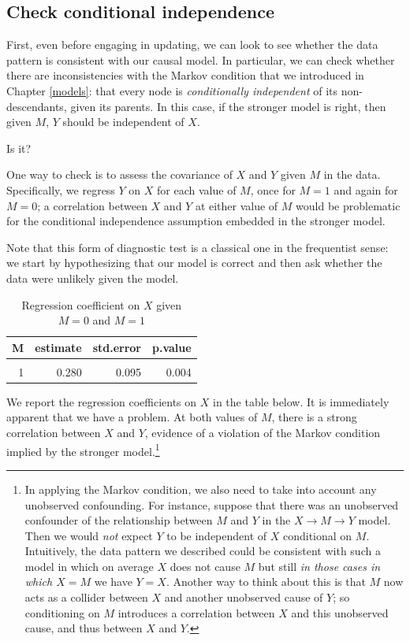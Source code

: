 \documentclass[
  12pt,
]{book}
\begin{document}
\hypertarget{check-conditional-independence}{%
\subsection{Check conditional independence}\label{check-conditional-independence}}

First, even before engaging in updating, we can look to see whether the data pattern is consistent with our causal model. In particular, we can check whether there are inconsistencies with the Markov condition that we introduced in Chapter \ref{models}: that every node is \emph{conditionally independent} of its non-descendants, given its parents. In this case, if the stronger model is right, then given \(M\), \(Y\) should be independent of \(X\).

Is it?

One way to check is to assess the covariance of \(X\) and \(Y\) given \(M\) in the data. Specifically, we regress \(Y\) on \(X\) for each value of \(M\), once for \(M=1\) and again for \(M=0\); a correlation between \(X\) and \(Y\) at either value of \(M\) would be problematic for the conditional independence assumption embedded in the stronger model.

Note that this form of diagnostic test is a classical one in the frequentist sense: we start by hypothesizing that our model is correct and then ask whether the data were unlikely given the model.

\begin{table}

\caption{\label{tab:unnamed-chunk-41}Regression coefficient on $X$ given $M=0$ and $M=1$}
\centering
\begin{tabular}[t]{rrrr}
\toprule
M & estimate & std.error & p.value\\
\midrule
\cellcolor{gray!6}{0} & \cellcolor{gray!6}{0.262} & \cellcolor{gray!6}{0.097} & \cellcolor{gray!6}{0.008}\\
1 & 0.280 & 0.095 & 0.004\\
\bottomrule
\end{tabular}
\end{table}

We report the regression coefficients on \(X\) in the table below. It is immediately apparent that we have a problem. At both values of \(M\), there is a strong correlation between \(X\) and \(Y\), evidence of a violation of the Markov condition implied by the stronger model.\footnote{In applying the Markov condition, we also need to take into account any unobserved confounding. For instance, suppose that there was an unobserved confounder of the relationship between \(M\) and \(Y\) in the \(X \rightarrow M \rightarrow Y\) model. Then we would \emph{not} expect \(Y\) to be independent of \(X\) conditional on \(M\). Intuitively, the data pattern we described could be consistent with such a model in which on average \(X\) does not cause \(M\) but still \emph{in those cases in which \(X=M\)} we have \(Y=X\). Another way to think about this is that \(M\) now acts as a collider between \(X\) and another unobserved cause of \(Y\); so conditioning on \(M\) introduces a correlation between \(X\) and this unobserved cause, and thus between \(X\) and \(Y\).}
\end{document}
